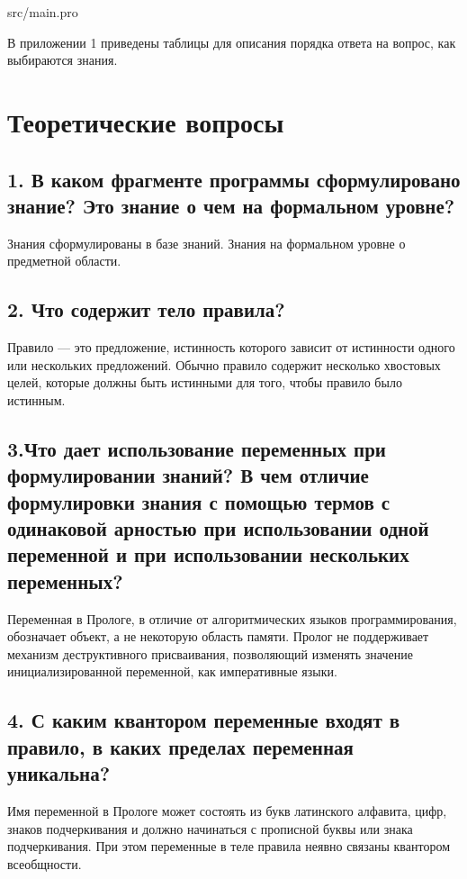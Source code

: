 \FloatBarrier
\begin{lstinputlisting}[style={lsp}]{src/main.pro}
\end{lstinputlisting}
\FloatBarrier

В приложении 1 приведены таблицы для описания порядка ответа на вопрос, как выбираются знания.

\chapter*{Теоретические вопросы}
\section*{1. В каком фрагменте программы сформулировано знание? Это знание о чем на формальном уровне?}
Знания сформулированы в базе знаний. Знания на формальном уровне о предметной области.

\section*{2. Что содержит тело правила?}

Правило — это предложение, истинность которого зависит от истинности одного или нескольких предложений. 
Обычно правило содержит несколько хвостовых целей, которые должны быть истинными для того, чтобы правило было истинным.

\section*{3.Что дает использование переменных при формулировании знаний? В чем отличие формулировки знания с помощью термов с одинаковой арностью при использовании одной переменной и при использовании нескольких переменных?}

Переменная в Прологе, в отличие от алгоритмических языков программирования, обозначает объект, а не некоторую область памяти. Пролог не поддерживает механизм деструктивного присваивания, позволяющий изменять значение инициализированной переменной, как императивные языки. 

\section*{4. С каким квантором переменные входят в правило, в каких пределах переменная уникальна?}
Имя переменной в Прологе может состоять из букв латинского алфавита, цифр, знаков подчеркивания и должно начинаться с прописной буквы или знака подчеркивания. 
При этом переменные в теле правила неявно связаны квантором всеобщности. 

